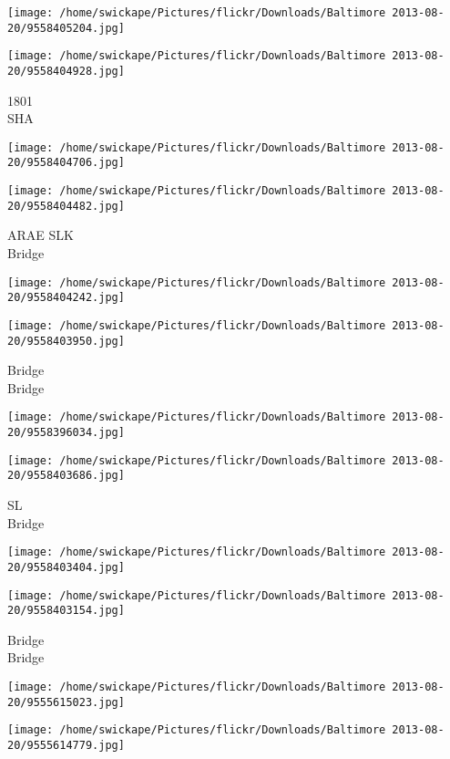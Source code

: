 \documentclass[10pt,letterpaper]{article}
\begin{document}
\texttt{[image: /home/swickape/Pictures/flickr/Downloads/Baltimore 2013-08-20/9558405204.jpg]}

\vspace{0.25in}
\texttt{[image: /home/swickape/Pictures/flickr/Downloads/Baltimore 2013-08-20/9558404928.jpg]}

1801\\
SHA
\pagebreak

\texttt{[image: /home/swickape/Pictures/flickr/Downloads/Baltimore 2013-08-20/9558404706.jpg]}

\vspace{0.25in}
\texttt{[image: /home/swickape/Pictures/flickr/Downloads/Baltimore 2013-08-20/9558404482.jpg]}

ARAE SLK\\
Bridge
\pagebreak

\texttt{[image: /home/swickape/Pictures/flickr/Downloads/Baltimore 2013-08-20/9558404242.jpg]}

\vspace{0.25in}
\texttt{[image: /home/swickape/Pictures/flickr/Downloads/Baltimore 2013-08-20/9558403950.jpg]}

Bridge\\
Bridge
\pagebreak

\texttt{[image: /home/swickape/Pictures/flickr/Downloads/Baltimore 2013-08-20/9558396034.jpg]}

\vspace{0.25in}
\texttt{[image: /home/swickape/Pictures/flickr/Downloads/Baltimore 2013-08-20/9558403686.jpg]}

SL\\
Bridge
\pagebreak

\texttt{[image: /home/swickape/Pictures/flickr/Downloads/Baltimore 2013-08-20/9558403404.jpg]}

\vspace{0.25in}
\texttt{[image: /home/swickape/Pictures/flickr/Downloads/Baltimore 2013-08-20/9558403154.jpg]}

Bridge\\
Bridge
\pagebreak

\texttt{[image: /home/swickape/Pictures/flickr/Downloads/Baltimore 2013-08-20/9555615023.jpg]}

\vspace{0.25in}
\texttt{[image: /home/swickape/Pictures/flickr/Downloads/Baltimore 2013-08-20/9555614779.jpg]}
\end{document}
